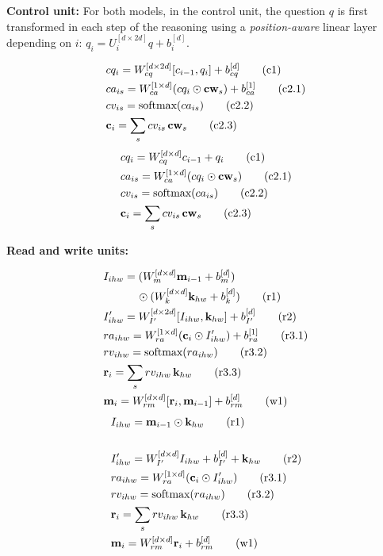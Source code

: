 \noindent\textbf{Control unit:} 
For both models, in the control unit, the question $q$ is first transformed in each step of 
the reasoning using a \emph{position-aware}
linear layer depending on $i$: $q_i = U_i^{[d \times 2d]} q + b_i^{[d]}$.

\begin{multicols}{2}
	\noindent
	\begin{align*}
	&cq_i = W_{cq}^{[d \times 2d]} [c_{i-1}, q_i] + b_{cq}^{[d]}  \tag{c1} \\
	&ca_{is} = W_{ca}^{[1 \times d]} (cq_i \odot \mathbf{cw}_s) + b_{ca}^{[1]}
	\tag{c2.1}\\
	&cv_{is} = \textrm{softmax}(ca_{is}) \tag{c2.2}\\
	&\mathbf{c}_i = \sum_s cv_{is} \, \mathbf{cw}_s  \tag{c2.3}
	\end{align*}
	\columnbreak
	{\color{Plum}
	\begin{align*}
	&cq_i = W_{cq}^{[d \times d]} c_{i-1} + q_i  \tag{c1} \\
	&ca_{is} = W_{ca}^{[1 \times d]} (cq_i \odot \mathbf{cw}_s)  \tag{c2.1}\\
	&cv_{is} = \textrm{softmax}(ca_{is}) \tag{c2.2}\\
	&\mathbf{c}_i = \sum_s cv_{is} \, \mathbf{cw}_s  \tag{c2.3}
    \end{align*}}
\end{multicols}

\newpage

\noindent\textbf{Read and write units:}
\begin{multicols}{2}
	\noindent
	\begin{align*}
	&I_{ihw} = (W_{m}^{[d \times d]} \mathbf{m}_{i-1} + b_{m}^{[d]}) \\
	           & \qquad \quad \odot (W_{k}^{[d \times d]} \mathbf{k}_{hw} + b_{k}^{[d]}) \tag{r1} \\
	&I'_{ihw} =  W_{I'}^{[d \times 2d]} [I_{ihw},\mathbf{k}_{hw}]  + b_{I'}^{[d]}  \tag{r2} \\
	&ra_{ihw} = W_{ra}^{[1 \times d]} (\mathbf{c}_i \odot I'_{ihw}) + b_{ra}^{[1]} \tag{r3.1}\\
	&rv_{ihw} = \textrm{softmax}(ra_{ihw}) \tag{r3.2}\\
	&\mathbf{r}_i = \sum_s rv_{ihw} \, \mathbf{k}_{hw}  \tag{r3.3}\\
	&\mathbf{m}_i = W_{rm}^{[d \times d]} [\mathbf{r}_i, \mathbf{m}_{i-1}]  + b_{rm}^{[d]} \tag{w1}	
	\end{align*}
	\columnbreak
	{\color{Plum}
	\begin{align*}
	&I_{ihw} = \mathbf{m}_{i-1} \odot \mathbf{k}_{hw} \tag{r1} \\ \\
	&I'_{ihw} = W_{I'}^{[d \times d]} I_{ihw} + b_{I'}^{[d]} + \mathbf{k}_{hw} \tag{r2} \\
	&ra_{ihw} = W_{ra}^{[1 \times d]} (\mathbf{c}_i \odot I'_{ihw})  \tag{r3.1}\\
	&rv_{ihw} = \textrm{softmax}(ra_{ihw}) \tag{r3.2}\\
	&\mathbf{r}_i = \sum_s rv_{ihw} \, \mathbf{k}_{hw}  \tag{r3.3}\\
	&\mathbf{m}_i = W_{rm}^{[d \times d]} \mathbf{r}_i + b_{rm}^{[d]} \tag{w1}
	\end{align*}}
\end{multicols}

